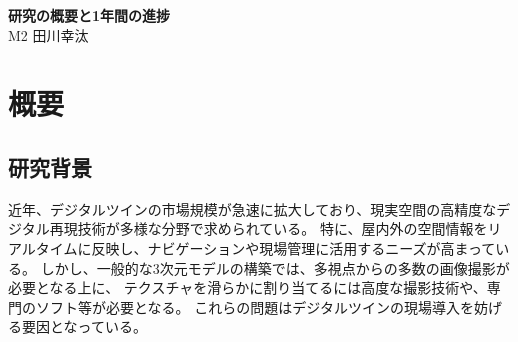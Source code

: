 \documentclass[]{jarticle}          %
\begin{document}

\vspace*{2ex}
\begin{center}
 {\Large \bf 研究の概要と1年間の進捗}\\ %
 \vspace*{5mm}
 {\large M2 田川幸汰}%
\end{center}






\section{概要}
\subsection{研究背景}
近年、デジタルツインの市場規模が急速に拡大しており、現実空間の高精度なデジタル再現技術が多様な分野で求められている\cite{bib1}。
特に、屋内外の空間情報をリアルタイムに反映し、ナビゲーションや現場管理に活用するニーズが高まっている。
しかし、一般的な3次元モデルの構築では、多視点からの多数の画像撮影が必要となる上に、
テクスチャを滑らかに割り当てるには高度な撮影技術や、専門のソフト等が必要となる。
これらの問題はデジタルツインの現場導入を妨げる要因となっている\cite{bib2}。
\end{document}

